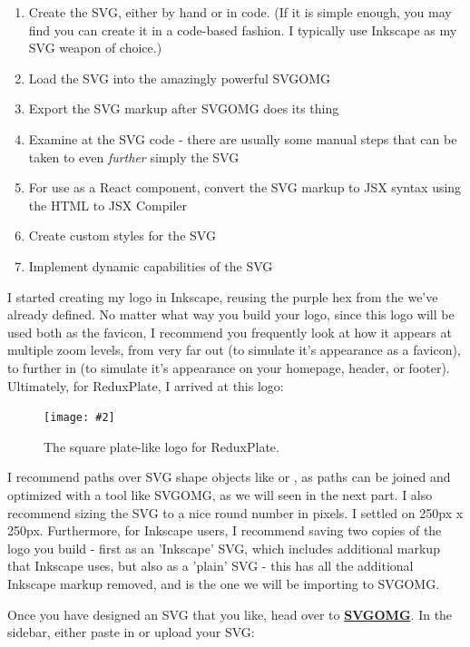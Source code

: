 \documentclass[paper=6in:9in,pagesize=pdftex,headinclude=on,footinclude=on,12pt,twoside]{scrbook}
\newcommand{\link}[2]{\textbf{\textcolor{monokaiPink}{\href{#2}{#1}}}}
\newcommand{\standardfigure}[3]{\begin{figure}[H]\begin{center}\texttt{[image: \#2]}\caption{#3}\label{fig:#2}\end{center}\end{figure}}
\begin{document}
\begin{enumerate}
\item Create the SVG, either by hand or in code. (If it is simple enough, you may find you can create it in a code-based fashion. I typically use Inkscape as my SVG weapon of choice.)
\item Load the SVG into the amazingly powerful SVGOMG
\item Export the SVG markup after SVGOMG does its thing
\item Examine at the SVG code - there are usually some manual steps that can be taken to even \textit{further} simply the SVG
\item For use as a React component, convert the SVG markup to JSX syntax using the HTML to JSX Compiler
\item Create custom styles for the SVG
\item Implement dynamic capabilities of the SVG
\end{enumerate}


I started creating my logo in Inkscape, reusing the purple hex from the  we've already defined. No matter what way you build your logo, since this logo will be used both as the favicon, I recommend you frequently look at how it appears at multiple zoom levels, from very far out (to simulate it's appearance as a favicon), to further in (to simulate it's appearance on your homepage, header, or footer). Ultimately, for ReduxPlate, I arrived at this logo:

\standardfigure{\textwidth/2}{frontend/logo-design/logo}{The square plate-like logo for ReduxPlate.}

I recommend paths over SVG shape objects like  or , as paths can be joined and optimized with a tool like SVGOMG, as we will seen in the next part. I also recommend sizing the SVG to a nice round number in pixels. I settled on 250px x 250px. Furthermore, for Inkscape users, I recommend saving two copies of the logo you build - first as an 'Inkscape' SVG, which includes additional markup that Inkscape uses, but also as a 'plain' SVG - this has all the additional Inkscape markup removed, and is the one we will be importing to SVGOMG.


Once you have designed an SVG that you like, head over to \link{SVGOMG}{https://jakearchibald.github.io/svgomg/}. In the sidebar, either paste in or upload your SVG:
\end{document}

